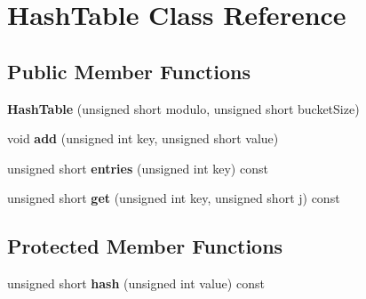 \hypertarget{class_hash_table}{}\section{Hash\+Table Class Reference}
\label{class_hash_table}
\subsection*{Public Member Functions}
\begin{DoxyCompactItemize}
\item 
\hypertarget{class_hash_table_a1f10b397f70824693bbb6579c0b3fc4b}{}{\bfseries Hash\+Table} (unsigned short modulo, unsigned short bucket\+Size)\label{class_hash_table_a1f10b397f70824693bbb6579c0b3fc4b}

\item 
\hypertarget{class_hash_table_af79c390da997046b564d452ff3a965eb}{}void {\bfseries add} (unsigned int key, unsigned short value)\label{class_hash_table_af79c390da997046b564d452ff3a965eb}

\item 
\hypertarget{class_hash_table_acf2d225037c8aca0450e56e6ff49923c}{}unsigned short {\bfseries entries} (unsigned int key) const \label{class_hash_table_acf2d225037c8aca0450e56e6ff49923c}

\item 
\hypertarget{class_hash_table_adae9eb6ae77e9dafc992d489ab1e7016}{}unsigned short {\bfseries get} (unsigned int key, unsigned short j) const \label{class_hash_table_adae9eb6ae77e9dafc992d489ab1e7016}

\end{DoxyCompactItemize}
\subsection*{Protected Member Functions}
\begin{DoxyCompactItemize}
\item 
\hypertarget{class_hash_table_a6ac9f7350e7e41abf531f476b694e48e}{}unsigned short {\bfseries hash} (unsigned int value) const \label{class_hash_table_a6ac9f7350e7e41abf531f476b694e48e}

\end{DoxyCompactItemize}
